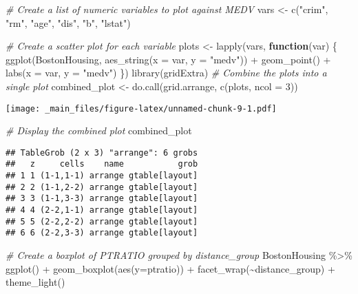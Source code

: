 \documentclass[
]{book}
\newenvironment{Shaded}{\begin{snugshade}}{\end{snugshade}}
\newcommand{\AttributeTok}[1]{\textcolor[rgb]{0.77,0.63,0.00}{#1}}
\newcommand{\CommentTok}[1]{\textcolor[rgb]{0.56,0.35,0.01}{\textit{#1}}}
\newcommand{\ControlFlowTok}[1]{\textcolor[rgb]{0.13,0.29,0.53}{\textbf{#1}}}
\newcommand{\DecValTok}[1]{\textcolor[rgb]{0.00,0.00,0.81}{#1}}
\newcommand{\FunctionTok}[1]{\textcolor[rgb]{0.00,0.00,0.00}{#1}}
\newcommand{\NormalTok}[1]{#1}
\newcommand{\OtherTok}[1]{\textcolor[rgb]{0.56,0.35,0.01}{#1}}
\newcommand{\SpecialCharTok}[1]{\textcolor[rgb]{0.00,0.00,0.00}{#1}}
\newcommand{\StringTok}[1]{\textcolor[rgb]{0.31,0.60,0.02}{#1}}
\begin{document}
\begin{Shaded}
\begin{Highlighting}[]
\CommentTok{\# Create a list of numeric variables to plot against MEDV}
\NormalTok{vars }\OtherTok{\textless{}{-}} \FunctionTok{c}\NormalTok{(}\StringTok{"crim"}\NormalTok{, }\StringTok{"rm"}\NormalTok{, }\StringTok{"age"}\NormalTok{, }\StringTok{"dis"}\NormalTok{, }\StringTok{"b"}\NormalTok{, }\StringTok{"lstat"}\NormalTok{)}

\CommentTok{\# Create a scatter plot for each variable}
\NormalTok{plots }\OtherTok{\textless{}{-}} \FunctionTok{lapply}\NormalTok{(vars, }\ControlFlowTok{function}\NormalTok{(var) \{}
  \FunctionTok{ggplot}\NormalTok{(BostonHousing, }\FunctionTok{aes\_string}\NormalTok{(}\AttributeTok{x =}\NormalTok{ var, }\AttributeTok{y =} \StringTok{"medv"}\NormalTok{)) }\SpecialCharTok{+}
    \FunctionTok{geom\_point}\NormalTok{() }\SpecialCharTok{+}
    \FunctionTok{labs}\NormalTok{(}\AttributeTok{x =}\NormalTok{ var, }\AttributeTok{y =} \StringTok{"medv"}\NormalTok{)}
\NormalTok{\})}
\FunctionTok{library}\NormalTok{(gridExtra)}
\CommentTok{\# Combine the plots into a single plot}
\NormalTok{combined\_plot }\OtherTok{\textless{}{-}} \FunctionTok{do.call}\NormalTok{(grid.arrange, }\FunctionTok{c}\NormalTok{(plots, }\AttributeTok{ncol =} \DecValTok{3}\NormalTok{))}
\end{Highlighting}
\end{Shaded}

\texttt{[image: \_main\_files/figure-latex/unnamed-chunk-9-1.pdf]}

\begin{Shaded}
\begin{Highlighting}[]
\CommentTok{\# Display the combined plot}
\NormalTok{combined\_plot}
\end{Highlighting}
\end{Shaded}

\begin{verbatim}
## TableGrob (2 x 3) "arrange": 6 grobs
##   z     cells    name           grob
## 1 1 (1-1,1-1) arrange gtable[layout]
## 2 2 (1-1,2-2) arrange gtable[layout]
## 3 3 (1-1,3-3) arrange gtable[layout]
## 4 4 (2-2,1-1) arrange gtable[layout]
## 5 5 (2-2,2-2) arrange gtable[layout]
## 6 6 (2-2,3-3) arrange gtable[layout]
\end{verbatim}

\begin{Shaded}
\begin{Highlighting}[]
\CommentTok{\# Create a boxplot of PTRATIO grouped by distance\_group}
\NormalTok{BostonHousing }\SpecialCharTok{\%\textgreater{}\%} \FunctionTok{ggplot}\NormalTok{() }\SpecialCharTok{+} 
\FunctionTok{geom\_boxplot}\NormalTok{(}\FunctionTok{aes}\NormalTok{(}\AttributeTok{y=}\NormalTok{ptratio)) }\SpecialCharTok{+}
  \FunctionTok{facet\_wrap}\NormalTok{(}\SpecialCharTok{\textasciitilde{}}\NormalTok{distance\_group) }\SpecialCharTok{+}
  \FunctionTok{theme\_light}\NormalTok{()}
\end{Highlighting}
\end{Shaded}
\end{document}
